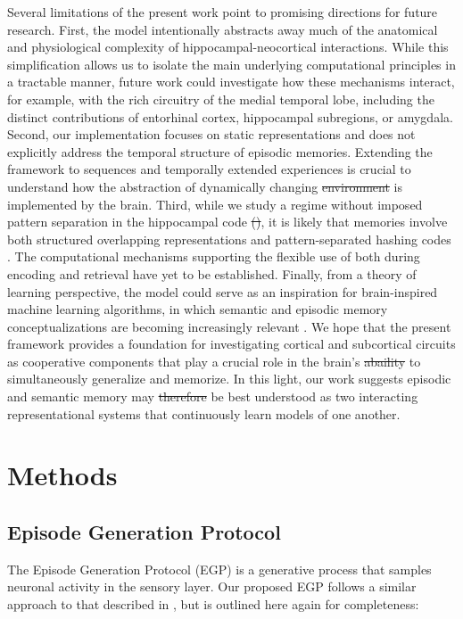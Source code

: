 \documentclass{article}
\providecommand{\DIFaddtex}[1]{{\protect\color{blue}\uwave{#1}}} %
\providecommand{\DIFdeltex}[1]{{\protect\color{red}\sout{#1}}}                      %
\providecommand{\DIFaddbegin}{} %
\providecommand{\DIFaddend}{} %
\providecommand{\DIFdelbegin}{} %
\providecommand{\DIFdelend}{} %
\providecommand{\DIFadd}[1]{\texorpdfstring{\DIFaddtex{#1}}{#1}} %
\providecommand{\DIFdel}[1]{\texorpdfstring{\DIFdeltex{#1}}{}} %
\begin{document}
Several limitations of the present work point to promising directions for future research. First, the model intentionally abstracts away much of the anatomical and physiological complexity of hippocampal-neocortical interactions. While this simplification allows us to isolate the main underlying computational principles in a tractable manner, future work could investigate how these mechanisms interact, for example, with the rich circuitry of the medial temporal lobe, including the distinct contributions of entorhinal cortex, hippocampal subregions, or amygdala. Second, our implementation focuses on static representations and does not explicitly address the temporal structure of episodic memories. Extending the framework to sequences and temporally extended experiences is crucial to understand how the abstraction of dynamically changing \DIFdelbegin \DIFdel{environment }\DIFdelend \DIFaddbegin \DIFadd{environments }\DIFaddend is implemented by the brain. Third, while we study a regime without imposed pattern separation in the hippocampal code \DIFdelbegin \DIFdel{(}\DIFdelend {}\DIFdelbegin \DIFdel{)}\DIFdelend , it is likely that memories involve both structured overlapping representations and pattern-separated hashing codes . The computational mechanisms supporting the flexible use of both during encoding and retrieval have yet to be established. Finally, from a theory of learning perspective, the model could serve as an inspiration for brain-inspired machine learning algorithms, in which semantic and episodic memory conceptualizations are becoming increasingly relevant .  
\newline\newline
We hope that the present framework provides a foundation for investigating cortical and subcortical circuits as cooperative components that play a crucial role in the brain's \DIFdelbegin \DIFdel{abaility }\DIFdelend \DIFaddbegin \DIFadd{ability }\DIFaddend to simultaneously generalize and memorize. In this light, our work suggests \DIFaddbegin \DIFadd{that }\DIFaddend episodic and semantic memory may \DIFdelbegin \DIFdel{therefore }\DIFdelend be best understood as two interacting representational systems that continuously learn models of one another.
\newpage
\section*{Methods}\label{methods}
\subsection*{Episode Generation Protocol}
The Episode Generation Protocol (EGP) is a generative process that samples neuronal activity in the sensory layer. Our proposed EGP follows a similar approach to that described in , but is outlined here again for completeness:
\end{document}
